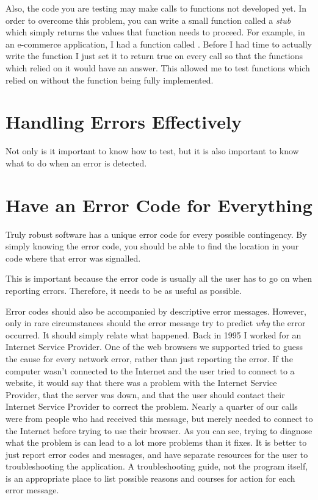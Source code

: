 Also, the code you are testing may make calls to functions not developed
yet.  In order to overcome this problem, you can write a small function 
called a \emph{stub} 
which simply returns the values that 
function needs to proceed.  For example, in an e-commerce application,
I had a function called .  Before
I had time to actually write the function I just set it to return true
on every call so that the functions which relied on it would have an
answer.  This allowed me to test functions which relied on 
 without the function being 
fully implemented.

\section{Handling Errors Effectively}
\label{handlingerrors}

Not only is it important to know how to test, but it is also important
to know what to do when an error is detected.

\section{Have an Error Code for Everything}

Truly robust software has a unique error code for every possible contingency.
By simply knowing the error code, you should be able to find the location
in your code where that error was signalled.

This is important because the error code is usually all the user has to go
on when reporting errors.  Therefore, it needs to be as useful as possible.

Error codes should also be accompanied by descriptive error messages.
However, only in rare circumstances should the error message try to 
predict \emph{why} the error occurred.  It should simply
relate what happened.  Back in 1995 I worked for an Internet Service Provider.
One of the web browsers we supported tried to guess the cause for every network
error, rather than just reporting the error.  If the computer wasn't connected
to the Internet and the user tried to connect to a website, it would say
that there was a problem with the Internet Service Provider, that the 
server was down, and that the user should contact their Internet Service
Provider to correct the problem.  Nearly a quarter of our calls were
from people who had received this message, but merely needed to connect
to the Internet before trying to use their browser.  As you can see, trying
to diagnose what the problem is can lead to a lot more problems than it
fixes.  It is better to just report error codes and messages, and 
have separate resources for the user to troubleshooting the application.
A troubleshooting guide, not the program itself, is an appropriate place
to list possible reasons and courses for action for each error message.


